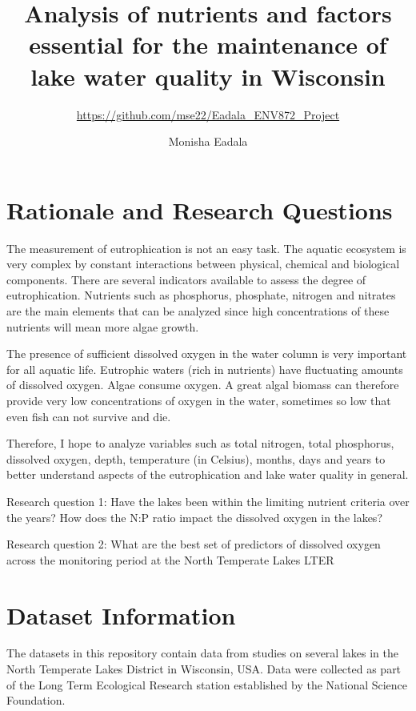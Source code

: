 \documentclass[12pt,]{article}
\title{Analysis of nutrients and factors essential for the maintenance of lake
water quality in Wisconsin}
\subtitle{\url{https://github.com/mse22/Eadala_ENV872_Project}}
\author{Monisha Eadala}
\date{}
\begin{document}
\maketitle

\newpage
\tableofcontents 
\newpage
\listoftables 
\newpage
\listoffigures 
\newpage

\hypertarget{rationale-and-research-questions}{%
\section{Rationale and Research
Questions}\label{rationale-and-research-questions}}

The measurement of eutrophication is not an easy task. The aquatic
ecosystem is very complex by constant interactions between physical,
chemical and biological components. There are several indicators
available to assess the degree of eutrophication. Nutrients such as
phosphorus, phosphate, nitrogen and nitrates are the main elements that
can be analyzed since high concentrations of these nutrients will mean
more algae growth.

The presence of sufficient dissolved oxygen in the water column is very
important for all aquatic life. Eutrophic waters (rich in nutrients)
have fluctuating amounts of dissolved oxygen. Algae consume oxygen. A
great algal biomass can therefore provide very low concentrations of
oxygen in the water, sometimes so low that even fish can not survive and
die.

Therefore, I hope to analyze variables such as total nitrogen, total
phosphorus, dissolved oxygen, depth, temperature (in Celsius), months,
days and years to better understand aspects of the eutrophication and
lake water quality in general.

Research question 1: Have the lakes been within the limiting nutrient
criteria over the years? How does the N:P ratio impact the dissolved
oxygen in the lakes?

Research question 2: What are the best set of predictors of dissolved
oxygen across the monitoring period at the North Temperate Lakes LTER

\newpage

\hypertarget{dataset-information}{%
\section{Dataset Information}\label{dataset-information}}

The datasets in this repository contain data from studies on several
lakes in the North Temperate Lakes District in Wisconsin, USA. Data were
collected as part of the Long Term Ecological Research station
established by the National Science Foundation.
\end{document}
